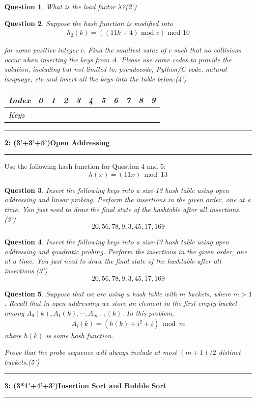 \documentclass[10.5pt]{article}
\newcommand\question[2]{\vspace{.25in}\hrule\textbf{#1: #2}\vspace{.5em}\hrule\vspace{.10in}}
\newtheorem{Q}{Question}
\begin{document}
\begin{Q}
What is the load factor $\lambda$?(2')
\vspace{3cm}
\end{Q}

\begin{Q}
Suppose the hash function is modified into
\begin{align*}
    h_2(k) = ((11k+4) \text{ mod } c) \text{ mod } 10
\end{align*}

for some positive integer $c$. Find the smallest value of $c$ such that no collisions occur when inserting the keys from $A$. Please use some codes to provide the solution, including but not limited to: pseudocode, Python/C code, natural language, etc and insert all the keys into the table below.(4')
\begin{table}[ht]
\begin{tabular}{|l|p{1.2cm}|p{1.2cm}|p{1.2cm}|p{1.2cm}|p{1.2cm}|p{1.2cm}|p{1.2cm}|p{1.2cm}|p{1.2cm}|p{1.2cm}|}
\hline
Index & 0&1&2&3&4&5&6&7&8&9 \\ \hline
Keys     & &&&&&&&&&     \\ \hline
\end{tabular}
\end{table}
\end{Q}
	
	\pagebreak
	

\question{2}{(3'+3'+5')Open Addressing}
Use the following hash function for Question 4 and 5:
$$h(x) = (11x) \bmod 13$$
\begin{Q}
 Insert the following keys into a size-13 hash table using open addressing and linear probing. Perform the insertions in the given order, one at a time. You just need to draw the final state of the hashtable after all insertions.(3')
    $$20,56,78,9,3,45,17,169$$
 \end{Q}
    \vspace{3cm}
    \begin{Q}
    Insert the following keys into a size-13 hash table using open addressing and quadratic probing. Perform the insertions in the given order, one at a time. You just need to draw the final state of the hashtable after all insertions.(3')
    $$20,56,78,9,3,45,17,169$$
    \end{Q}
    \vspace{3cm}
    \begin{Q}Suppose that we are using a hash table with $m$ buckets, where $m > 1$. Recall that in open addressing we store an element in the first empty bucket among $A_0(k), A_1(k),\cdots,A_{m-1}(k)$. In this problem, 
    \begin{align*}
        A_i(k) = (h(k)+i^2+i) \bmod m
    \end{align*}
    where $h(k)$ is some hash function.
    
    Prove that the probe sequence will always include at most $(m+1)/2$ distinct buckets.(5')
\end{Q}
\pagebreak
\question{3}{(3*1'+4'+3')Insertion Sort and Bubble Sort}
\end{document}
